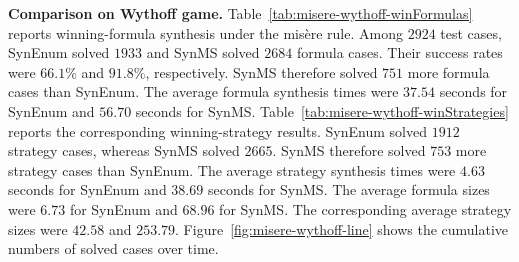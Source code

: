 \documentclass[review]{elsarticle}
\begin{document}
{\color{red}
\textbf{Comparison on Wythoff game.}
Table~\ref{tab:misere-wythoff-winFormulas} reports winning-formula synthesis under the mis\`{e}re rule.
Among $2924$ test cases, SynEnum solved $1933$ and SynMS solved $2684$ formula cases.
Their success rates were $66.1\%$ and $91.8\%$, respectively.
SynMS therefore solved $751$ more formula cases than SynEnum.
The average formula synthesis times were $37.54$ seconds for SynEnum and $56.70$ seconds for SynMS.
Table~\ref{tab:misere-wythoff-winStrategies} reports the corresponding winning-strategy results.
SynEnum solved $1912$ strategy cases, whereas SynMS solved $2665$.
SynMS therefore solved $753$ more strategy cases than SynEnum.
The average strategy synthesis times were $4.63$ seconds for SynEnum and $38.69$ seconds for SynMS.
The average formula sizes were $6.73$ for SynEnum and $68.96$ for SynMS.
The corresponding average strategy sizes were $42.58$ and $253.79$.
Figure~\ref{fig:misere-wythoff-line} shows the cumulative numbers of solved cases over time.
}
\end{document}
